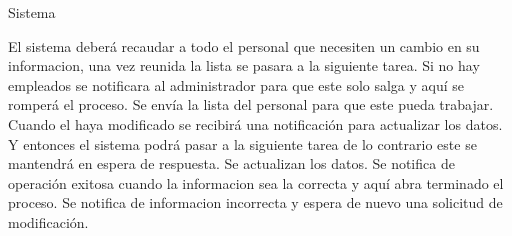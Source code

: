 \begin{PDescripcion}
    \Ppaso Sistema
    \begin{enumerate}
    	\Ppaso[\itarea]  El sistema deberá recaudar a todo el personal que necesiten un cambio en su informacion, una vez reunida la lista se pasara a la siguiente tarea. Si no hay empleados se notificara al administrador para que este solo salga y aquí se romperá el proceso.
    	\Ppaso[\itarea]  Se envía la lista del personal  para que este pueda trabajar. Cuando el haya modificado se recibirá una
notificación para actualizar los datos. Y entonces el sistema podrá pasar a la siguiente tarea de lo contrario este se mantendrá en espera de respuesta.
	\Ppaso[\itarea]  Se actualizan los datos. Se notifica de operación exitosa cuando la informacion sea la correcta y aquí abra terminado el proceso. Se notifica de informacion incorrecta y espera de nuevo una solicitud de modificación.
    	
    \end{enumerate}
\end{PDescripcion}


